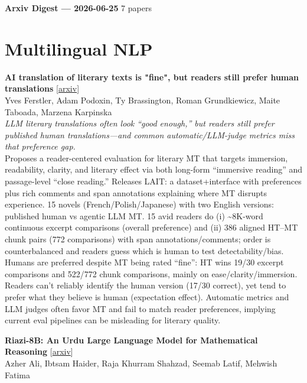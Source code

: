 \documentclass[12pt,letterpaper]{article}
\begin{document}
{\footnotesize\textbf{Arxiv Digest --- 2026-06-25} \hfill 7 papers}

\smallskip

\section*{Multilingual NLP}

{\small\textbf{AI translation of literary texts is "fine", but readers still prefer human translations}} {\scriptsize[\href{https://arxiv.org/abs/2606.26040}{arxiv}]}\\
{\scriptsize Yves Ferstler, Adam Podoxin, Ty Brassington, Roman Grundkiewicz, Maite Taboada, Marzena Karpinska}\\

{\small\textit{LLM literary translations often look ``good enough,'' but readers still prefer published human translations---and common automatic/LLM-judge metrics miss that preference gap.}}\\[1pt]
{\footnotesize Proposes a reader-centered evaluation for literary MT that targets immersion, readability, clarity, and literary effect via both long-form ``immersive reading'' and passage-level ``close reading.'' Releases LAIT: a dataset+interface with preferences plus rich comments and span annotations explaining where MT disrupts experience. 15 novels (French/Polish/Japanese) with two English versions: published human vs agentic LLM MT. 15 avid readers do (i) \textasciitilde{}8K-word continuous excerpt comparisons (overall preference) and (ii) 386 aligned HT--MT chunk pairs (772 comparisons) with span annotations/comments; order is counterbalanced and readers guess which is human to test detectability/bias. Humans are preferred despite MT being rated ``fine'': HT wins 19/30 excerpt comparisons and 522/772 chunk comparisons, mainly on ease/clarity/immersion. Readers can't reliably identify the human version (17/30 correct), yet tend to prefer what they believe is human (expectation effect). Automatic metrics and LLM judges often favor MT and fail to match reader preferences, implying current eval pipelines can be misleading for literary quality.}

\medskip

{\small\textbf{Riazi-8B: An Urdu Large Language Model for Mathematical Reasoning}} {\scriptsize[\href{https://arxiv.org/abs/2606.25568}{arxiv}]}\\
{\scriptsize Azher Ali, Ibtsam Haider, Raja Khurram Shahzad, Seemab Latif, Mehwish Fatima}\\
\end{document}
